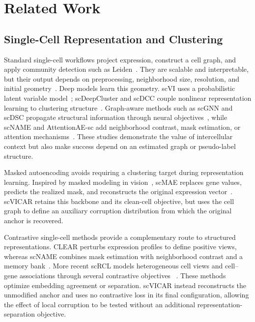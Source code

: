 \section{Related Work}
\label{sec:related}

\subsection{Single-Cell Representation and Clustering}

Standard single-cell workflows project expression, construct a cell graph, and
apply community detection such as Leiden~\cite{wolf2018scanpy,traag2019leiden}.
They are scalable and interpretable, but their output depends on preprocessing,
neighborhood size, resolution, and initial geometry~\cite{kiselev2019challenges}.
Deep models learn this geometry. scVI uses a probabilistic latent
variable model~\cite{lopez2018scvi}; scDeepCluster and scDCC couple nonlinear
representation learning to clustering structure~\cite{tian2019scdeepcluster,tian2021scdcc}.
Graph-aware methods such as scGNN and scDSC propagate structural information
through neural objectives~\cite{wang2021scgnn,gan2022scdsc}, while scNAME and
AttentionAE-sc add neighborhood contrast, mask estimation, or attention
mechanisms~\cite{wan2022scname,li2023attentionae}.  These studies demonstrate
the value of intercellular context but also make success depend on an estimated
graph or pseudo-label structure.

Masked autoencoding avoids requiring a clustering target during representation
learning.  Inspired by masked modeling in vision~\cite{he2022mae}, scMAE
replaces gene values, predicts the realized mask, and reconstructs the original
expression vector~\cite{fang2024scmae}.  scVICAR retains this backbone and its
clean-cell objective, but uses the cell graph to define an auxiliary corruption
distribution from which the original anchor is recovered.

Contrastive single-cell methods provide a complementary route to structured
representations. CLEAR perturbs expression profiles to define positive views,
whereas scNAME combines mask estimation with neighborhood contrast and a memory
bank~\cite{wan2022scname}. More recent scRCL models heterogeneous cell views and
cell--gene associations through several contrastive objectives
~\cite{peng2024scrcl}. These methods optimize embedding agreement or separation.
scVICAR instead reconstructs the unmodified anchor and uses no contrastive loss
in its final configuration, allowing the effect of local corruption to be
tested without an additional representation-separation objective.

